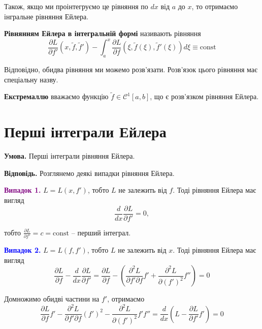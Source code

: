 \documentclass[14pt]{extarticle}
\newcommand{\<}{\langle}
\renewcommand{\>}{\rangle}
\theoremstyle{mystyle}{\newtheorem{definition}{Definition}[section]}
\theoremstyle{mystyle}{\newtheorem{proposition}[definition]{Proposition}}
\theoremstyle{mystyle}{\newtheorem{theorem}[definition]{Theorem}}
\theoremstyle{mystyle}{\newtheorem{lemma}[definition]{Lemma}}
\theoremstyle{mystyle}{\newtheorem{corollary}[definition]{Corollary}}
\theoremstyle{mystyle}{\newtheorem*{remark}{Remark}}
\theoremstyle{mystyle}{\newtheorem*{remarks}{Remarks}}
\theoremstyle{mystyle}{\newtheorem*{example}{Example}}
\theoremstyle{mystyle}{\newtheorem*{examples}{Examples}}
\theoremstyle{definition}{\newtheorem*{exercise}{Exercise}}
\theoremstyle{cstyle}{\newtheorem*{cthm}{}}
\theoremstyle{warn}
\begin{document}
Також, якщо ми проінтегруємо це рівняння по $dx$ від $a$ до $x$, то отримаємо інгральне рівняння Ейлера.

\begin{definition}
\textbf{Рівнянням Ейлера в інтегральній формі} називають рівняння
\begin{equation}
    \frac{\partial L}{\partial f'}(x,\widetilde{f},\widetilde{f}') - \int_a^x \frac{\partial L}{\partial f}(\xi,\widetilde{f}(\xi),\widetilde{f}'(\xi))d\xi \equiv \text{const}
\end{equation}
\end{definition}

Відповідно, обидва рівняння ми можемо розв'язати. Розв'язок цього рівняння має спеціальну назву.

\begin{definition}\textbf{Екстремаллю} вважаємо функцію $\widetilde{f} \in \mathcal{C}^1[a,b]$, що є розв'язком рівняння Ейлера.
\end{definition}

\pagebreak
\section{Перші інтеграли Ейлера}

\textbf{Умова.} Перші інтеграли рівняння Ейлера.

\textbf{Відповідь.} Розглянемо деякі випадки рівняння Ейлера.

\textcolor{purple}{\textbf{Випадок 1.}} $L = L(x,f')$, тобто $L$ не залежить від $f$. Тоді рівняння Ейлера має вигляд
\begin{equation}
    \frac{d}{dx}\frac{\partial L}{\partial f'} = 0,
\end{equation}

тобто $\frac{\partial L}{\partial f'} = c=\text{const}$ -- перший інтеграл. 

\textcolor{blue}{\textbf{Випадок 2.}} $L = L(f,f')$, тобто $L$ не залежить від $x$. Тоді рівняння Ейлера має вигляд
\begin{equation}
    \frac{\partial L}{\partial f} - \frac{d}{dx}\frac{\partial L}{\partial f'} = \frac{\partial L}{\partial f} - \left(\frac{\partial^2 L}{\partial f' \partial f}f' + \frac{\partial^2 L}{\partial (f')^2}f''\right) = 0
\end{equation}

Домножимо обидві частини на $f'$, отримаємо
\begin{equation}
    \frac{\partial L}{\partial f}f' - \frac{\partial^2 L}{\partial f' \partial f}(f')^2 - \frac{\partial^2 L}{\partial (f')^2}f'f'' = \frac{d}{dx}\left(L-\frac{\partial L}{\partial f'}f'\right) = 0
\end{equation}
\end{document}

